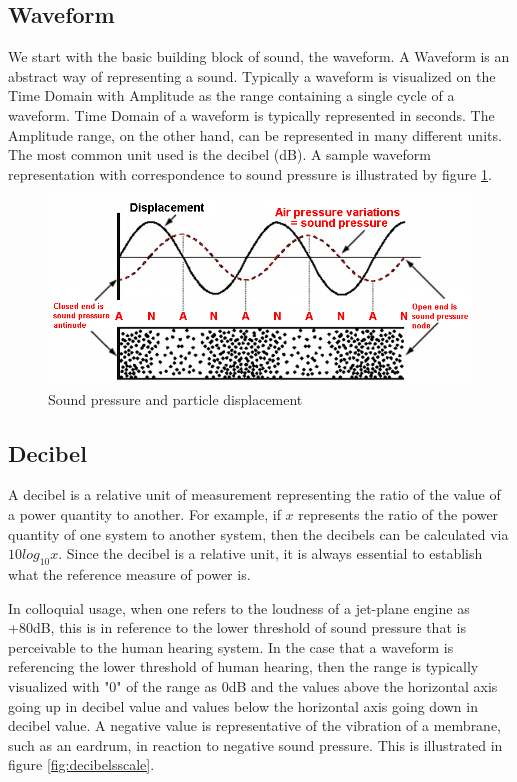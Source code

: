 \documentclass[a4paper,12pt]{report}
\begin{document}
\subsection{Waveform}
\label{subsec:waveform}
We start with the basic building block of sound, the waveform. A Waveform is an abstract way of representing a sound. Typically a waveform is visualized on the Time Domain with Amplitude as the range containing a single cycle of a waveform. Time Domain of a waveform is typically represented in seconds. The Amplitude range, on the other hand, can be represented in many different units. The most common unit used is the decibel (dB). A sample waveform representation with correspondence to sound pressure is illustrated by figure \ref{fig:particledisplacementsoundpressure}.

\begin{figure}
    \centering
    \includegraphics[width=32em]{ParticleDisplacement-SoundPressure-Node-Antinode.jpg}
    \caption{Sound pressure and particle displacement}
    \label{fig:particledisplacementsoundpressure}
\end{figure}

\subsection{Decibel}
\label{subsec:decibel}
A decibel is a relative unit of measurement representing the ratio of the value of a power quantity to another. For example, if $x$ represents the ratio of the power quantity of one system to another system, then the decibels can be calculated via $10 log_10 x$. Since the decibel is a relative unit, it is always essential to establish what the reference measure of power is. 

In colloquial usage, when one refers to the loudness of a jet-plane engine as +80dB, this is in reference to the lower threshold of sound pressure that is perceivable to the human hearing system. In the case that a waveform is referencing the lower threshold of human hearing, then the range is typically visualized with "0" of the range as 0dB and the values above the horizontal axis going up in decibel value and values below the horizontal axis going down in decibel value. A negative value is representative of the vibration of a membrane, such as an eardrum, in reaction to negative sound pressure. This is illustrated in figure \ref{fig:decibelsscale}.
\end{document}
